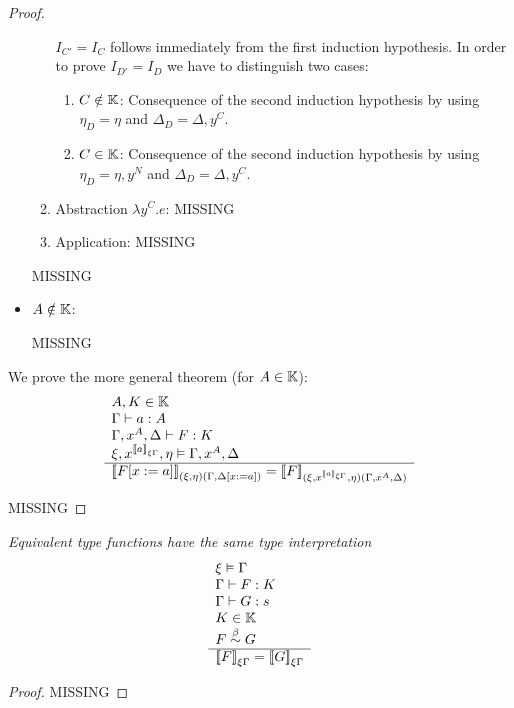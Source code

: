 \begin{theorem}
\begin{proof}
\begin{itemize}
\begin{enumerate}
                $I_{C'} = I_C$ follows immediately from the first induction
                hypothesis. In order to prove $I_{D'} = I_D$ we have to
                distinguish two cases:
                \begin{enumerate}
                \item $C \notin \mathbb{K}$: Consequence of the second induction
                    hypothesis by using $\eta_D = \eta$ and $\Delta_D =
                        \Delta,y^C$.

                \item $C \in \mathbb{K}$: Consequence of the second induction
                    hypothesis by using $\eta_D = \eta,y^N$ and $\Delta_D =
                        \Delta,y^C$.
                \end{enumerate}

            \item Abstraction $\lambda y^C. e$:
                MISSING

            \item Application:
                MISSING

            \end{enumerate}

            MISSING

        \item $A \notin \mathbb{K}$:

            MISSING
        \end{itemize}

        We prove the more general theorem (for $A \in \mathbb{K}$):
        $$
        \rulev{
            A,K \in \Kinds
            \\
            \Gamma \vdash a: A
            \\
            \Gamma,x^A,\Delta \vdash F : K
            \\
            \xi,x^{\tintera},\eta \vDash \Gamma,x^A,\Delta
        }
        {
            \typeinter{F[x:=a]}{(\xi,\eta)(\Gamma,\Delta[x:=a])}
            =
            \typeinter{F}{(\xi,x^\tintera,\eta)(\Gamma,x^A,\Delta)}
        }
        $$

        MISSING
    \end{proof}
\end{theorem}



\begin{theorem}
    \label{TypeInterpretationEquivalence}
    \emph{Equivalent type functions have the same type interpretation}
    $$
    \begin{array}{l} 
        \xi \vDash \Gamma
        \\
        \Gamma \vdash F : K
        \\
        \Gamma \vdash G : s
        \\
        K \in \mathbb{K}
        \\
        F \stackrel{\beta}{\sim} G
     \\ \hline 
        {{[\![}F{]\!]}}_{\xi\Gamma} = {{[\![} G{]\!]}}_{\xi\Gamma}
    \end{array}
    $$
    \begin{proof}
        MISSING
    \end{proof}
\end{theorem}




